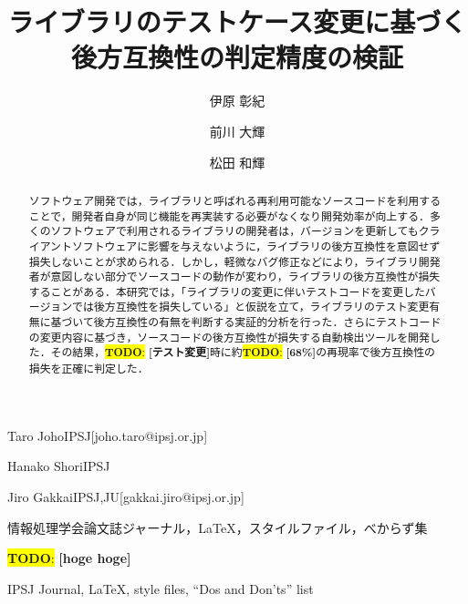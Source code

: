 \documentclass[submit]{ipsj}
\newcommand{\todo}[1]{\colorbox{yellow}{{\bf TODO}:}{\color{red} {\textbf{[#1]}}}}
\begin{document}
\title{ライブラリのテストケース変更に基づく後方互換性の判定精度の検証}





\author{伊原 彰紀}{Taro Joho}{IPSJ}[joho.taro@ipsj.or.jp]
\author{前川 大輝}{Hanako Shori}{IPSJ}
\author{松田 和輝}{Jiro Gakkai}{IPSJ,JU}[gakkai.jiro@ipsj.or.jp]

\begin{abstract}
ソフトウェア開発では，ライブラリと呼ばれる再利用可能なソースコードを利用することで，開発者自身が同じ機能を再実装する必要がなくなり開発効率が向上する．多くのソフトウェアで利用されるライブラリの開発者は，バージョンを更新してもクライアントソフトウェアに影響を与えないように，ライブラリの後方互換性を意図せず損失しないことが求められる．しかし，軽微なバグ修正などにより，ライブラリ開発者が意図しない部分でソースコードの動作が変わり，ライブラリの後方互換性が損失することがある．本研究では，「ライブラリの変更に伴いテストコードを変更したバージョンでは後方互換性を損失している」と仮説を立て，ライブラリのテスト変更有無に基づいて後方互換性の有無を判断する実証的分析を行った．さらにテストコードの変更内容に基づき，ソースコードの後方互換性が損失する自動検出ツールを開発した．その結果，\todo{テスト変更}時に約\todo{68\%}の再現率で後方互換性の損失を正確に判定した．
\end{abstract}


\begin{jkeyword}
情報処理学会論文誌ジャーナル，\LaTeX，スタイルファイル，べからず集
\end{jkeyword}

\begin{eabstract}
\todo{hoge hoge}
\end{eabstract}

\begin{ekeyword}
IPSJ Journal, \LaTeX, style files, ``Dos and Don'ts'' list
\end{ekeyword}

\maketitle
\end{document}
